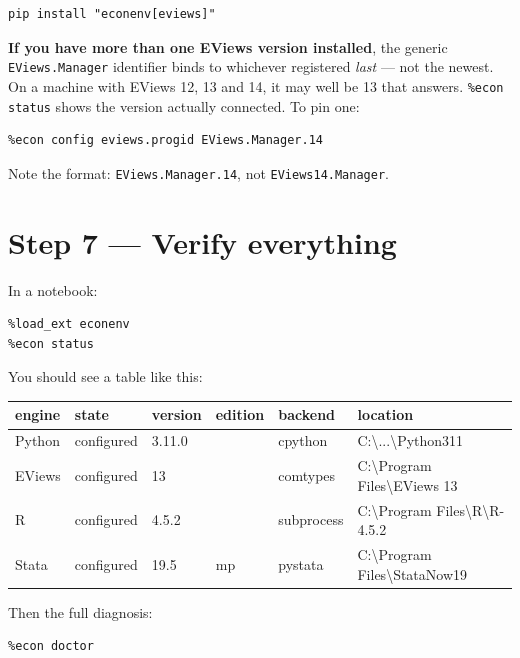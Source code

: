 \documentclass[11pt,a4paper]{report}
\begin{document}
\begin{lstlisting}
pip install "econenv[eviews]"
\end{lstlisting}

\begin{warn}
\textbf{If you have more than one EViews version installed}, the generic
\texttt{EViews.Manager} identifier binds to whichever registered \emph{last} ---
not the newest. On a machine with EViews 12, 13 and 14, it may well be 13 that
answers. \texttt{\%econ status} shows the version actually connected. To pin one:

\begin{lstlisting}
%econ config eviews.progid EViews.Manager.14
\end{lstlisting}

Note the format: \texttt{EViews.Manager.14}, not \texttt{EViews14.Manager}.
\end{warn}

\section{Step 7 --- Verify everything}

In a notebook:

\begin{lstlisting}
%load_ext econenv
%econ status
\end{lstlisting}

You should see a table like this:

\begin{center}
\ttfamily\footnotesize
\begin{tabular}{@{}llllll@{}}
\toprule
engine & state & version & edition & backend & location \\
\midrule
Python & configured & 3.11.0 & & cpython & C:\textbackslash ...\textbackslash Python311 \\
EViews & configured & 13 & & comtypes & C:\textbackslash Program Files\textbackslash EViews 13 \\
R & configured & 4.5.2 & & subprocess & C:\textbackslash Program Files\textbackslash R\textbackslash R-4.5.2 \\
Stata & configured & 19.5 & mp & pystata & C:\textbackslash Program Files\textbackslash StataNow19 \\
\bottomrule
\end{tabular}
\end{center}

Then the full diagnosis:

\begin{lstlisting}
%econ doctor
\end{lstlisting}
\end{document}
